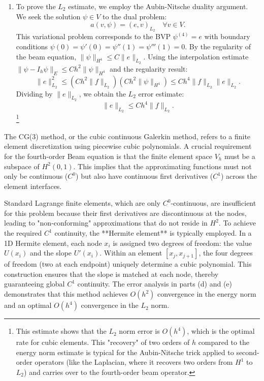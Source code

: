 \begin{solution}
\begin{enumerate}
    \item[(e)] To prove the $L_2$ estimate, we employ the Aubin-Nitsche duality argument. We seek the solution $\psi \in V$ to the dual problem:
    \[
    a(v, \psi) = (e, v)_{L_2} \quad \forall v \in V.
    \]
    This variational problem corresponds to the BVP $\psi^{(4)} = e$ with boundary conditions $\psi(0) = \psi'(0) = \psi''(1) = \psi'''(1) = 0$. By the regularity of the beam equation, $\|\psi\|_{H^4} \leq C \|e\|_{L_2}$.
    Using the interpolation estimate $\|\psi - I_h \psi\|_E \leq C h^2 \|\psi\|_{H^4} $ and the regularity result:
    \[
    \|e\|_{L_2}^2 \leq (C h^2 \|f\|_{L_2}) (C h^2 \|\psi\|_{H^4}) \leq C h^4 \|f\|_{L_2} \|e\|_{L_2}.
    \]
    Dividing by $\|e\|_{L_2}$, we obtain the $L_2$ error estimate:
    \[
    \|e\|_{L_2} \leq C h^4 \|f\|_{L_2}.
    \] \footnote{This estimate shows that the $L_2$ norm error is $O(h^4)$, which is the optimal rate for cubic elements. This "recovery" of two orders of $h$ compared to the energy norm estimate is typical for the Aubin-Nitsche trick applied to second-order operators (like the Laplacian, where it recovers two orders from $H^1$ to $L_2$) and carries over to the fourth-order beam operator.}
\end{enumerate}
\end{solution}

\begin{remark}
The CG(3) method, or the cubic continuous Galerkin method, refers to a finite element discretization using piecewise cubic polynomials. A crucial requirement for the fourth-order Beam equation is that the finite element space $V_h$ must be a subspace of $H^2(0, 1)$. This implies that the approximating functions must not only be continuous ($C^0$) but also have continuous first derivatives ($C^1$) across the element interfaces. 

Standard Lagrange finite elements, which are only $C^0$-continuous, are insufficient for this problem because their first derivatives are discontinuous at the nodes, leading to "non-conforming" approximations that do not reside in $H^2$. To achieve the required $C^1$ continuity, the **Hermite element** is typically employed. In a 1D Hermite element, each node $x_i$ is assigned two degrees of freedom: the value $U(x_i)$ and the slope $U'(x_i)$. Within an element $[x_j, x_{j+1}]$, the four degrees of freedom (two at each endpoint) uniquely determine a cubic polynomial. This construction ensures that the slope is matched at each node, thereby guaranteeing global $C^1$ continuity. The error analysis in parts (d) and (e) demonstrates that this method achieves $O(h^2)$ convergence in the energy norm and an optimal $O(h^4)$ convergence in the $L_2$ norm.
\end{remark}

